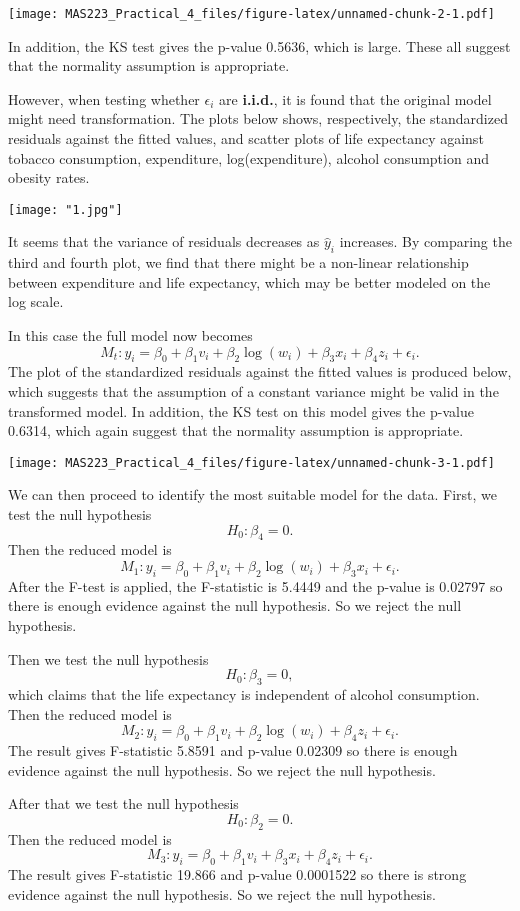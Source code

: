 \documentclass[
]{article}
\begin{document}
\texttt{[image: MAS223\_Practical\_4\_files/figure-latex/unnamed-chunk-2-1.pdf]}

In addition, the KS test gives the p-value 0.5636, which is large. These
all suggest that the normality assumption is appropriate.

However, when testing whether \(\epsilon_i\) are \textbf{i.i.d.}, it is
found that the original model might need transformation. The plots below
shows, respectively, the standardized residuals against the fitted
values, and scatter plots of life expectancy against tobacco
consumption, expenditure, log(expenditure), alcohol consumption and
obesity rates.

\texttt{[image: "1.jpg"]}

It seems that the variance of residuals decreases as \(\hat y_i\)
increases. By comparing the third and fourth plot, we find that there
might be a non-linear relationship between expenditure and life
expectancy, which may be better modeled on the log scale.

In this case the full model now becomes
\[M_t: y_i=\beta_0+\beta_1v_i+\beta_2\log(w_i)+\beta_3x_i+\beta_4z_i+\epsilon_i.\]
The plot of the standardized residuals against the fitted values is
produced below, which suggests that the assumption of a constant
variance might be valid in the transformed model. In addition, the KS
test on this model gives the p-value 0.6314, which again suggest that
the normality assumption is appropriate.

\texttt{[image: MAS223\_Practical\_4\_files/figure-latex/unnamed-chunk-3-1.pdf]}

We can then proceed to identify the most suitable model for the data.
First, we test the null hypothesis \[H_0: \beta_4=0.\] Then the reduced
model is
\[M_1: y_i=\beta_0+\beta_1v_i+\beta_2\log(w_i)+\beta_3x_i+\epsilon_i.\]After
the F-test is applied, the F-statistic is 5.4449 and the p-value is
0.02797 so there is enough evidence against the null hypothesis. So we
reject the null hypothesis.

Then we test the null hypothesis \[H_0: \beta_3=0,\] which claims that
the life expectancy is independent of alcohol consumption. Then the
reduced model is
\[M_2: y_i=\beta_0+\beta_1v_i+\beta_2\log(w_i)+\beta_4z_i+\epsilon_i.\]
The result gives F-statistic 5.8591 and p-value 0.02309 so there is
enough evidence against the null hypothesis. So we reject the null
hypothesis.

After that we test the null hypothesis \[H_0: \beta_2=0.\] Then the
reduced model is
\[M_3: y_i=\beta_0+\beta_1v_i+\beta_3x_i+\beta_4z_i+\epsilon_i.\] The
result gives F-statistic 19.866 and p-value 0.0001522 so there is strong
evidence against the null hypothesis. So we reject the null hypothesis.
\end{document}
